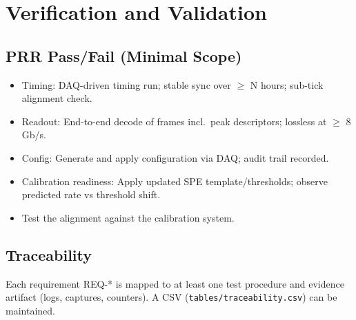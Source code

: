 
\section{Verification and Validation}\label{sec:prr-tests}
\subsection{PRR Pass/Fail (Minimal Scope)}
\begin{itemize}
  \item Timing: DAQ-driven timing run; stable sync over $\ge$ N hours; sub-tick alignment check.
  \item Readout: End-to-end decode of frames incl.\ peak descriptors; lossless at $\ge$ 8\,Gb/s.
  \item Config: Generate and apply configuration via DAQ; audit trail recorded.
  \item Calibration readiness: Apply updated SPE template/thresholds; observe predicted rate vs threshold shift.
  \item Test the alignment against the calibration system.
\end{itemize}
\subsection{Traceability}
Each requirement REQ-* is mapped to at least one test procedure and evidence artifact (logs, captures, counters). A CSV (\texttt{tables/traceability.csv}) can be maintained.
